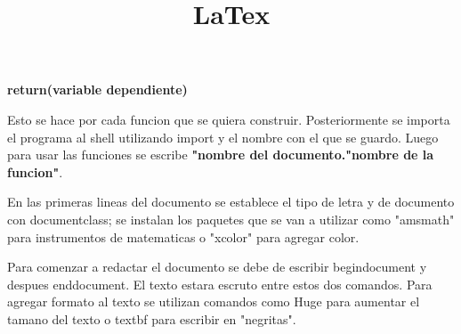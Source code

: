 \documentclass[letter paper, 12pt, oneside]{article}
\begin{document}
\textbf{return(variable dependiente)} 


Esto se hace por cada funcion que se quiera construir. Posteriormente se importa el programa al shell utilizando import y el nombre con el que se guardo. Luego para usar las funciones se escribe \textbf{"nombre del documento."nombre de la funcion"}.


\newpage
\title{\huge\textbf{LaTex}}


En las primeras lineas del documento se establece el tipo de letra y de documento con documentclass; se instalan los paquetes que se van a utilizar como "amsmath" para instrumentos de matematicas o "xcolor" para agregar color. 


Para comenzar a redactar el documento se debe de escribir begin{document} y despues end{document}. El texto estara escruto entre estos dos comandos. 
Para agregar formato al texto se utilizan comandos como Huge para aumentar el tamano del texto o textbf para escribir en "negritas". 
\end{document}
